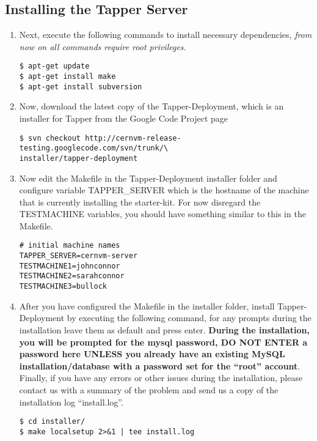 \subsection{Installing the Tapper Server}
\begin{enumerate}
\item 	Next, execute the following commands to install necessary dependencies, \emph{from now on all commands require root privileges}.
\lstset{caption= Install Dependencies}
\begin{lstlisting}
$ apt-get update
$ apt-get install make
$ apt-get install subversion
\end{lstlisting}

\item 	Now, download the latest copy of the Tapper-Deployment, which is an installer for Tapper from the \cernvmreleasetesting 
		Google Code Project page
\lstset{caption= Download Tapper-Deployment}
\begin{lstlisting}
$ svn checkout http://cernvm-release-testing.googlecode.com/svn/trunk/\
installer/tapper-deployment
\end{lstlisting}

\item 	Now edit the Makefile in the Tapper-Deployment installer folder and configure variable TAPPER\_SERVER which 
		is the hostname of the machine that is currently installing the starter-kit. For now disregard the TESTMACHINE 
		variables, you should have something similar to this in the Makefile.
\lstset{caption= Makefile Configuration}
\begin{lstlisting}
# initial machine names
TAPPER_SERVER=cernvm-server
TESTMACHINE1=johnconnor
TESTMACHINE2=sarahconnor
TESTMACHINE3=bullock
\end{lstlisting}

\item	After you have configured the Makefile in the installer folder, install Tapper-Deployment by executing the
		following command, for any prompts during the installation leave them as default and press enter. {\bf During
		the installation, you will be prompted for the mysql password, DO NOT ENTER a password here UNLESS you already have an
		existing MySQL installation/database with a password set for the ``root'' account}. Finally, if you have any errors or
		other issues during the installation, please contact us with a summary of the problem and send us a copy of the installation 
		log ``install.log''.
\lstset{caption= Install Tapper-Deployment}
\begin{lstlisting}
$ cd installer/
$ make localsetup 2>&1 | tee install.log
\end{lstlisting}
\end{enumerate}

